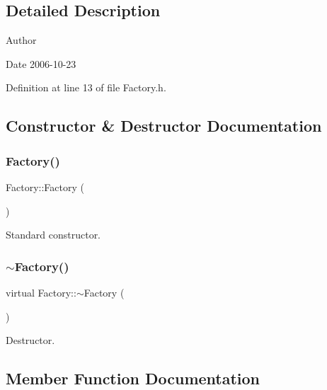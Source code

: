 \subsection{Detailed Description}
\begin{DoxyAuthor}{Author}

\end{DoxyAuthor}
\begin{DoxyDate}{Date}
2006-\/10-\/23 
\end{DoxyDate}


Definition at line 13 of file Factory.\+h.



\subsection{Constructor \& Destructor Documentation}
\mbox{\label{classFactory_ac792bf88cfb7b6804b479529da5308cc}} 
\subsubsection{\texorpdfstring{Factory()}{Factory()}}
{\footnotesize\ttfamily Factory\+::\+Factory (\begin{DoxyParamCaption}{ }\end{DoxyParamCaption})}



Standard constructor. 

\mbox{\label{classFactory_abb3d73c23bef3ca95487856ef0d7c476}} 
\subsubsection{\texorpdfstring{$\sim$\+Factory()}{~Factory()}}
{\footnotesize\ttfamily virtual Factory\+::$\sim$\+Factory (\begin{DoxyParamCaption}{ }\end{DoxyParamCaption})\hspace{0.3cm}{\ttfamily [virtual]}}



Destructor. 



\subsection{Member Function Documentation}
\mbox{\label{classFactory_a21cd37e4b21b06e574cf67faea08782a}} 
